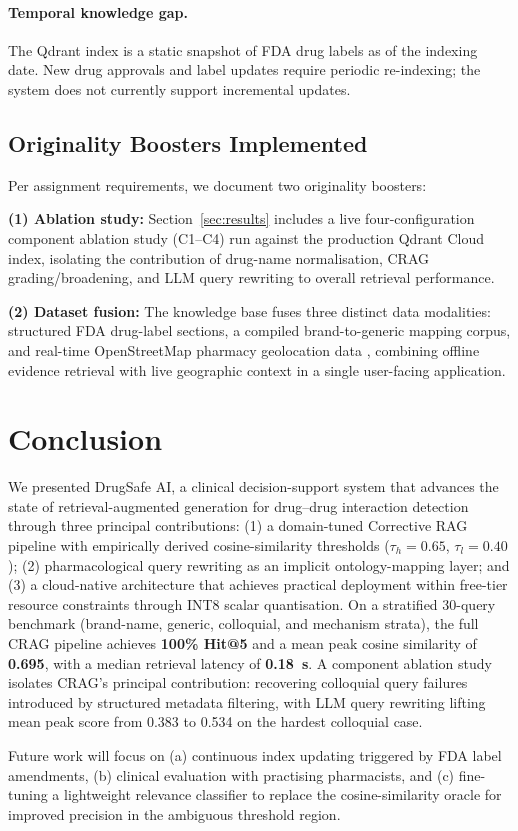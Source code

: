 \documentclass[10pt, twocolumn]{article}
\begin{document}
\paragraph{Temporal knowledge gap.}
The Qdrant index is a static snapshot of FDA drug labels as of the
indexing date.  New drug approvals and label updates require periodic
re-indexing; the system does not currently support incremental updates.

\subsection{Originality Boosters Implemented}
Per assignment requirements, we document two originality boosters:

\textbf{(1) Ablation study:} Section~\ref{sec:results} includes a live
four-configuration component ablation study (C1--C4) run against the
production Qdrant Cloud index, isolating the contribution of drug-name
normalisation, CRAG grading/broadening, and LLM query rewriting to
overall retrieval performance.

\textbf{(2) Dataset fusion:} The knowledge base fuses three distinct
data modalities: structured FDA drug-label sections, a compiled
brand-to-generic mapping corpus, and real-time OpenStreetMap pharmacy
geolocation data \cite{osm2024}, combining offline evidence retrieval
with live geographic context in a single user-facing application.

\section{Conclusion}
\label{sec:conclusion}

We presented DrugSafe AI, a clinical decision-support system that
advances the state of retrieval-augmented generation for
drug--drug interaction detection through three principal contributions:
(1) a domain-tuned Corrective RAG pipeline with empirically derived
cosine-similarity thresholds ($\tau_h = 0.65$, $\tau_l = 0.40$);
(2) pharmacological query rewriting as an implicit ontology-mapping
layer; and (3) a cloud-native architecture that achieves practical
deployment within free-tier resource constraints through INT8 scalar
quantisation.  On a stratified 30-query benchmark (brand-name,
generic, colloquial, and mechanism strata), the full CRAG pipeline
achieves \textbf{100\% Hit@5} and a mean peak cosine similarity of
\textbf{0.695}, with a median retrieval latency of \textbf{0.18~s}.
A component ablation study isolates CRAG's principal contribution:
recovering colloquial query failures introduced by structured
metadata filtering, with LLM query rewriting lifting mean peak
score from 0.383 to 0.534 on the hardest colloquial case.

Future work will focus on (a) continuous index updating triggered by
FDA label amendments, (b) clinical evaluation with practising pharmacists,
and (c) fine-tuning a lightweight relevance classifier to replace the
cosine-similarity oracle for improved precision in the ambiguous
threshold region.



\end{document}
